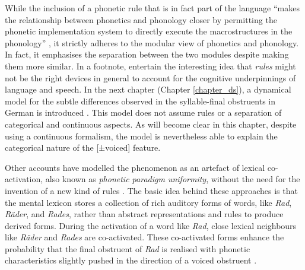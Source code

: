 While the inclusion of a phonetic rule that is in fact part of the language ``makes the relationship between phonetics and phonology closer by permitting the phonetic implementation system to directly execute the macrostructures in the phonology” \citep[468--469]{PortODell1985}, it strictly adheres to the modular view of phonetics and phonology. In fact, it emphasises the separation between the two modules despite making them more similar. In a footnote, \cite{PortODell1985} entertain the interesting idea that \emph{rules} might not be the right devices in general to account for the cognitive underpinnings of language and speech. In the next chapter (Chapter \ref{chapter_ds}), a dynamical model for the subtle differences observed in the syllable-final obstruents in German is introduced \citep{Gafos2006, GafosBenus2006}. This model does not assume rules or a separation of categorical and continuous aspects. As will become clear in this chapter, despite using a continuous formalism, the model is nevertheless able to explain the categorical nature of the [±voiced] feature.

Other accounts have modelled the phenomenon as an artefact of lexical co-activation, also known as \emph{phonetic paradigm uniformity}, without the need for the invention of a new kind of rules \citep[e.g.][]{ErnestusBaayen2006, GoldrickFolkRapp2010, KleberJohnHarrington2010, WinterRoettger2011, Roettgeretal2014, SeyfarthKlokGarellek2019}. The basic idea behind these approaches is that the mental lexicon stores a collection of rich auditory forms of words, like \emph{Rad}, \emph{Räder}, and \emph{Rades}, rather than abstract representations and rules to produce derived forms. During the activation of a word like \emph{Rad}, close lexical neighbours like \emph{Räder} and \emph{Rades} are co-activated. These co-activated forms enhance the probability that the final obstruent of \emph{Rad} is realised with phonetic characteristics slightly pushed in the direction of a voiced obstruent \citep{ErnestusBaayen2006, Roettgeretal2014}. 

